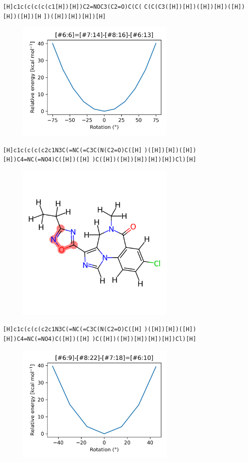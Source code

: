 \documentclass{beamer}
\begin{document}
\begin{frame}[fragile]
\verb|[H]c1c(c(c(c(c1[H])[H])C2=NOC3(C2=O)C(C(|
\verb|C(C(C3([H])[H])([H])[H])([H])[H])([H])[H|
\verb|])([H])[H])[H])[H]|

\begin{figure}
    \includegraphics[width=0.7\textwidth,height=0.7\textheight,keepaspectratio]{plot08.png}
\end{figure}
\end{frame}
\begin{frame}[fragile]
\verb|[H]c1c(c(c(c2c1N3C(=NC(=C3C(N(C2=O)C([H]|
\verb|)([H])[H])([H])[H])C4=NC(=NO4)C([H])([H]|
\verb|)C([H])([H])[H])[H])[H])Cl)[H]|

\begin{figure}
    \includegraphics[width=0.7\textwidth,height=0.7\textheight,keepaspectratio]{mol10.png}
\end{figure}
\end{frame}
\begin{frame}[fragile]
\verb|[H]c1c(c(c(c2c1N3C(=NC(=C3C(N(C2=O)C([H]|
\verb|)([H])[H])([H])[H])C4=NC(=NO4)C([H])([H]|
\verb|)C([H])([H])[H])[H])[H])Cl)[H]|

\begin{figure}
    \includegraphics[width=0.7\textwidth,height=0.7\textheight,keepaspectratio]{plot10.png}
\end{figure}
\end{frame}
\end{document}
